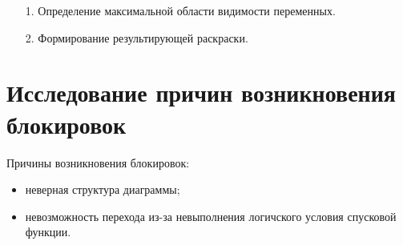 \documentclass[12pt]{article}
\begin{document}
\begin{minipage}[H]{0.55\linewidth}
\end{minipage}
\hfill
\begin{minipage}[H]{0.44\linewidth}
	\begin{enumerate}
	\item[1.] Определение максимальной области видимости переменных.
	\item[2.] Формирование результирующей раскраски.
	\end{enumerate}
\end{minipage}

\section{Исследование причин возникновения блокировок}

Причины возникновения блокировок:

\begin{itemize}
\item неверная структура диаграммы;
\item невозможность перехода из-за невыполнения логичского условия спусковой функции.
\end{itemize}
\end{document}
